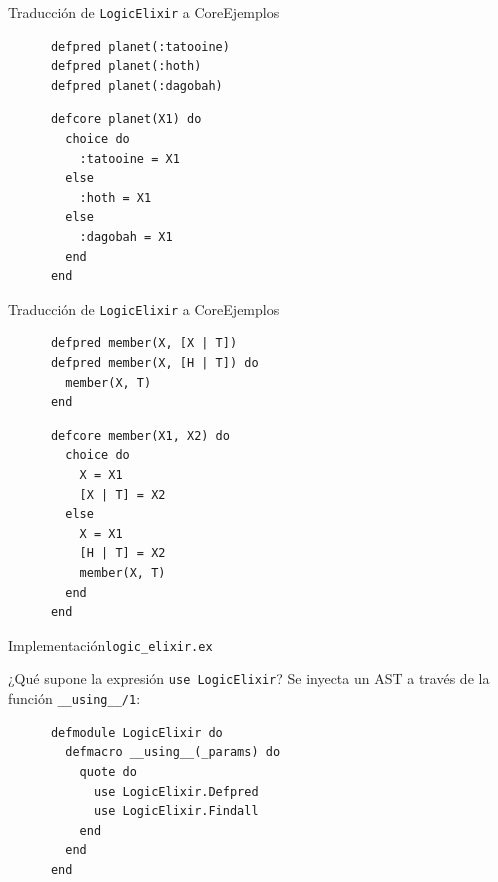 \documentclass[14pt,aspectratio=169]{beamer}
\begin{document}
\begin{frame}[fragile]{Traducción de \texttt{LogicElixir} a Core}{Ejemplos}
  \begin{multicols}{2}
    \footnotesize \begin{verbatim}
      defpred planet(:tatooine)
      defpred planet(:hoth)
      defpred planet(:dagobah)
    \end{verbatim}
    \columnbreak
    \footnotesize \begin{verbatim}
      defcore planet(X1) do
        choice do
          :tatooine = X1
        else
          :hoth = X1
        else
          :dagobah = X1
        end
      end
    \end{verbatim}
  \end{multicols}
\end{frame}

\begin{frame}[fragile]{Traducción de \texttt{LogicElixir} a Core}{Ejemplos}
  \begin{multicols}{2}
    \footnotesize \begin{verbatim}
      defpred member(X, [X | T])
      defpred member(X, [H | T]) do
        member(X, T)
      end
    \end{verbatim}
    \columnbreak
    \footnotesize \begin{verbatim}
      defcore member(X1, X2) do
        choice do
          X = X1
          [X | T] = X2
        else
          X = X1
          [H | T] = X2
          member(X, T)
        end
      end
    \end{verbatim}
  \end{multicols}
\end{frame}

\begin{frame}[fragile]{Implementación}{\texttt{logic\_elixir.ex}}
  \begin{block}{¿Qué supone la expresión \texttt{use LogicElixir}?}
    Se inyecta un AST a través de la función \texttt{\_\_using\_\_/1}:
    \begin{verbatim}
      defmodule LogicElixir do
        defmacro __using__(_params) do
          quote do
            use LogicElixir.Defpred
            use LogicElixir.Findall
          end
        end
      end
    \end{verbatim}
  \end{block}
\end{frame}
\end{document}

